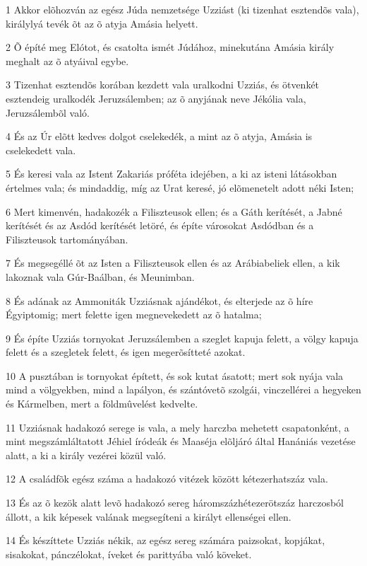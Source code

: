 \par 1 Akkor elõhozván az egész Júda nemzetsége Uzziást (ki tizenhat esztendõs vala), királylyá tevék õt az õ atyja Amásia helyett.
\par 2 Õ építé meg Elótot, és csatolta ismét Júdához, minekutána Amásia király meghalt az õ atyáival egybe.
\par 3 Tizenhat esztendõs korában kezdett vala uralkodni Uzziás, és ötvenkét esztendeig uralkodék Jeruzsálemben; az õ anyjának neve Jékólia vala, Jeruzsálembõl való.
\par 4 És az Úr elõtt kedves dolgot cselekedék, a mint az õ atyja, Amásia is cselekedett vala.
\par 5 És keresi vala az Istent Zakariás próféta idejében, a ki az isteni látásokban értelmes vala; és mindaddig, míg az Urat keresé, jó elõmenetelt adott néki Isten;
\par 6 Mert kimenvén, hadakozék a Filiszteusok ellen; és a Gáth kerítését, a Jabné kerítését és az Asdód kerítését letöré, és építe városokat Asdódban és a Filiszteusok tartományában.
\par 7 És megsegéllé õt az Isten a Filiszteusok ellen és az Arábiabeliek ellen, a kik lakoznak vala Gúr-Baálban, és Meunimban.
\par 8 És adának az Ammoniták Uzziásnak ajándékot, és elterjede az õ híre Égyiptomig; mert felette igen megnevekedett az õ hatalma;
\par 9 És építe Uzziás tornyokat Jeruzsálemben a szeglet kapuja felett, a völgy kapuja felett és a szegletek felett, és igen megerõsítteté azokat.
\par 10 A pusztában is tornyokat épített, és sok kutat ásatott; mert sok nyája vala mind a völgyekben, mind a lapályon, és szántóvetõ szolgái, vinczellérei a hegyeken és Kármelben, mert a földmûvelést kedvelte.
\par 11 Uzziásnak hadakozó serege is vala, a mely harczba mehetett csapatonként, a mint megszámláltatott Jéhiel íródeák és Maaséja elõljáró által Hanániás vezetése alatt, a ki a király vezérei közül való.
\par 12 A családfõk egész száma a hadakozó vitézek között kétezerhatszáz vala.
\par 13 És az õ kezök alatt levõ hadakozó sereg háromszázhétezerötszáz harczosból állott, a kik képesek valának megsegíteni a királyt ellenségei ellen.
\par 14 És készíttete Uzziás nékik, az egész sereg számára paizsokat, kopjákat, sisakokat, pánczélokat, íveket és parittyába való köveket.
